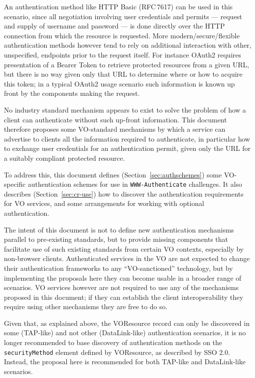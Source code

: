 \documentclass[11pt,a4paper]{ivoa}
\newcommand{\rfc}[1]{RFC\,#1}
\newcommand{\header}[1]{{\tt #1}}
\begin{document}
An authentication method like HTTP Basic (\rfc{7617})
can be used in this scenario,
since all negotiation involving user credentials and permits ---
request and supply of username and password ---
is done directly
over the HTTP connection from which the resource is requested.
More modern/secure/flexible authentication methods however tend to
rely on additional interaction with other, unspecified, endpoints
prior to the request itself.  For instance OAuth2 requires presentation
of a Bearer Token to retrieve protected resources from a given URL,
but there is no way given only that URL to determine where or how
to acquire this token;
in a typical OAuth2 usage scenario such information is known up front
by the components making the request.

No industry standard mechanism appears to exist to solve the
problem of how a client can authenticate without such up-front
information.
This document therefore proposes some VO-standard mechanisms
by which a service can advertise to clients all the information
required to authenticate,
in particular how to exchange user credentials for an authentication permit,
given only the URL for a suitably compliant protected resource.

To address this, this document defines (Section~\ref{sec:authschemes})
some VO-specific authentication schemes
for use in \header{WWW-Authenticate} challenges.
It also describes (Section~\ref{sec:cr-use}) how to discover the
authentication requirements for VO services, and
some arrangements for working with optional authentication.

The intent of this document is not to define new authentication
mechanisms parallel to pre-existing standards, but to provide
missing components that facilitate use of such existing standards
from certain VO contexts, especially by non-browser clients.
Authenticated services in the VO are not expected to change their
authentication frameworks to any ``VO-sanctioned'' technology,
but by implementing the proposals here they can become usable
in a broader range of scenarios.
VO services however are not required to use any of the  
mechanisms proposed in this document; if they can establish the
client interoperability they require using other mechanisms
they are free to do so.

Given that, as explained above,
the VOResource record can only be discovered in some (TAP-like)
and not other (DataLink-like) authentication scenarios,
it is no longer recommended to base discovery of authentication methods
on the {\tt securityMethod} element
defined by VOResource, as described by SSO 2.0.
Instead, the proposal here is recommended for both TAP-like and DataLink-like
scenarios.
\end{document}
